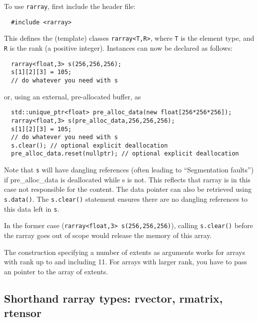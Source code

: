 \documentclass[11pt,twoside]{article}
\begin{document}
To use \texttt{rarray}, first include the header file:
\begin{framed}\vspace{-14pt}%
\begin{verbatim}
  #include <rarray>
\end{verbatim}%
\vspace{-14pt}
\end{framed}
\noindent
This defines the (template) classes \texttt{rarray{\tt<}T,R{\tt>}}, where
\texttt T is the element type, and \texttt R is the
rank (a positive integer).  Instances can now be
declared as follows:
\begin{framed}\vspace{-18pt}%
\begin{verbatim}
  rarray<float,3> s(256,256,256);
  s[1][2][3] = 105;
  // do whatever you need with s
\end{verbatim}%
\vspace{-14pt}
\end{framed}
\noindent
or, using an external, pre-allocated buffer, as
\begin{framed}\vspace{-18pt}%
\begin{verbatim}
  std::unique_ptr<float> pre_alloc_data(new float[256*256*256]); 
  rarray<float,3> s(pre_alloc_data,256,256,256);
  s[1][2][3] = 105;
  // do whatever you need with s
  s.clear(); // optional explicit deallocation
  pre_alloc_data.reset(nullptr); // optional explicit deallocation
\end{verbatim}%
\vspace{-14pt}
\end{framed}
Note that \texttt{s} will have dangling references (often leading to
``Segmentation faults'') if pre\_alloc\_data is deallocated while s is
not.  This reflects that rarray is in this case not responsible
for the content. The data pointer can also be retrieved using
\texttt{s.data()}. The \texttt{s.clear()} statement ensures there are
no dangling references to this data left in \texttt{s}. 

In the former case (\texttt{rarray<float,3> s(256,256,256)}), calling
\texttt{s.clear()} before the rarray goes out of scope would
release the memory of this array.

The construction specifying a number of extents as arguments works for arrays with rank up to and including 11. For arrays with larger rank, you have to pass an pointer to the array of extents.

\subsection{Shorthand rarray types: rvector, rmatrix, rtensor}
\end{document}
